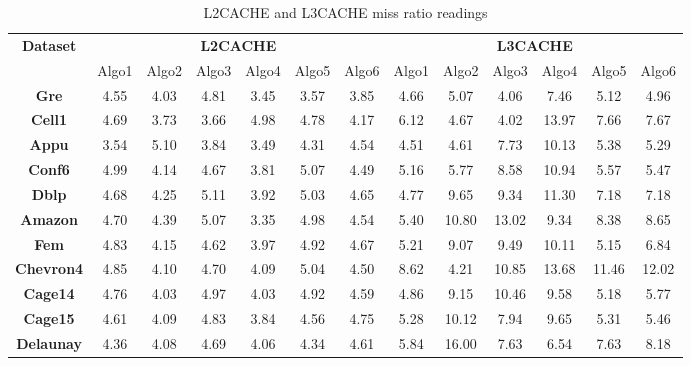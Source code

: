 \begin{table}[th]
\small
\centering

\begin{tabular}{ c|c|c|c|c|c|c|c|c|c|c|c|c| }
\hline
\multicolumn{1}{|c|}{\textbf{Dataset}} &
\multicolumn{6}{c}{\textbf{L2CACHE}} &
  \multicolumn{6}{|c|}{\textbf{L3CACHE}} \\
  \cline{2-13}
  \multicolumn{1}{|c|}{} &
  Algo1 & Algo2 & Algo3 & Algo4 & Algo5 & Algo6 & Algo1 & Algo2 & Algo3 & Algo4 & Algo5 & Algo6\\\hline
    \hline
  \multicolumn{1}{|c|}{\textbf{Gre}}
& 4.55 & 4.03 & 4.81 & \cellcolor{blue!25}3.45 & 3.57 & 3.85 & 4.66 & 5.07 & \cellcolor{green!25}4.06 & 7.46 & 5.12 & 4.96 \\ \hline
  \multicolumn{1}{|c|}{\textbf{Cell1}}
& 4.69 & 3.73 & \cellcolor{blue!25}3.66 & 4.98 & 4.78 & 4.17 & 6.12 & 4.67 & \cellcolor{green!25}4.02 & 13.97 & 7.66 & 7.67\\ \hline
  \multicolumn{1}{|c|}{\textbf{Appu}}
& 3.54 & 5.10 & 3.84 & \cellcolor{blue!25}3.49 & 4.31 & 4.54 & \cellcolor{green!25}4.51 & 4.61 & 7.73 & 10.13 & 5.38 & 5.29\\ \hline
\multicolumn{1}{|c|}{\textbf{Conf6}}
& 4.99 & 4.14 & 4.67 & \cellcolor{blue!25}3.81 & 5.07 & 4.49 & \cellcolor{green!25}5.16 & 5.77 & 8.58 & 10.94 & 5.57 & 5.47\\ \hline
  \multicolumn{1}{|c|}{\textbf{Dblp}}
& 4.68 & 4.25 & 5.11 & \cellcolor{blue!25}3.92 & 5.03 & 4.65 & \cellcolor{green!25}4.77 & 9.65 & 9.34 & 11.30 & 7.18 & 7.18\\ \hline
  \multicolumn{1}{|c|}{\textbf{Amazon}}
& 4.70 & 4.39 & 5.07 & \cellcolor{blue!25}3.35 & 4.98 & 4.54 & \cellcolor{green!25}5.40 & 10.80 & 13.02 & 9.34 & 8.38 & 8.65\\ \hline
  \multicolumn{1}{|c|}{\textbf{Fem}}
& 4.83 & 4.15 & 4.62 & \cellcolor{blue!25}3.97 & 4.92 & 4.67 & 5.21 & 9.07 & 9.49 & 10.11 & \cellcolor{green!25}5.15 & 6.84\\ \hline
  \multicolumn{1}{|c|}{\textbf{Chevron4}}
& 4.85 & 4.10 & 4.70 & \cellcolor{blue!25}4.09 & 5.04 & 4.50 & 8.62 & \cellcolor{green!25}4.21 & 10.85 & 13.68 & 11.46 & 12.02\\ \hline
  \multicolumn{1}{|c|}{\textbf{Cage14}}
& 4.76 & \cellcolor{blue!25}4.03 & 4.97 & 4.03 & 4.92 & 4.59 & \cellcolor{green!25}4.86 & 9.15 & 10.46 & 9.58 & 5.18 & 5.77\\ \hline
  \multicolumn{1}{|c|}{\textbf{Cage15}}
& 4.61 & 4.09 & 4.83 & \cellcolor{blue!25}3.84 & 4.56 & 4.75 & \cellcolor{green!25}5.28 & 10.12 & 7.94 & 9.65 & 5.31 & 5.46\\ \hline
  \multicolumn{1}{|c|}{\textbf{Delaunay}}
& 4.36 & 4.08 & 4.69 & \cellcolor{blue!25}4.06 & 4.34 & 4.61 & \cellcolor{green!25}5.84 & 16.00 & 7.63 & 6.54 & 7.63 & 8.18\\ \hline
\end{tabular}

\caption{\capfont L2CACHE and L3CACHE miss ratio readings }
\label{tab:Table6}
\end{table}

